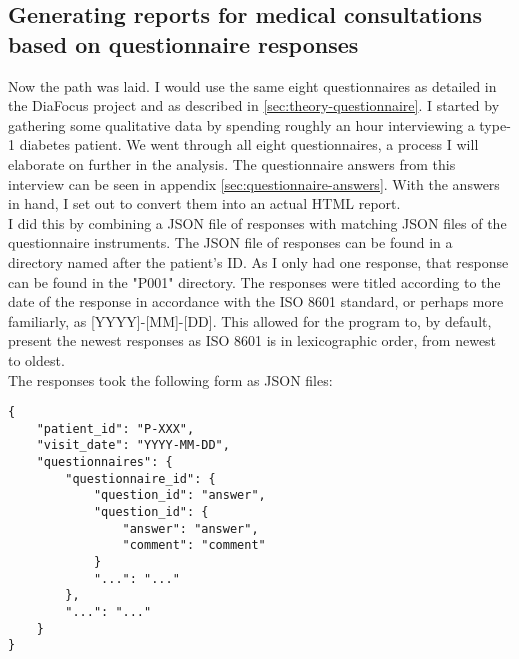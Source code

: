 \subsection{Generating reports for medical consultations based on questionnaire responses}
Now the path was laid. I would use the same eight questionnaires as detailed in the DiaFocus project and as described in \autoref{sec:theory-questionnaire}. I started by gathering some qualitative data by spending roughly an hour interviewing a type-1 diabetes patient. We went through all eight questionnaires, a process I will elaborate on further in the analysis. The questionnaire answers from this interview can be seen in appendix \autoref{sec:questionnaire-answers}. With the answers in hand, I set out to convert them into an actual HTML report.
\\
I did this by combining a JSON file of responses with matching JSON files of the questionnaire instruments. The JSON file of responses can be found in a directory named after the patient's ID. As I only had one response, that response can be found in the "P001" directory. The responses were titled according to the date of the response in accordance with the ISO 8601 standard, or perhaps more familiarly, as [YYYY]-[MM]-[DD]. This allowed for the program to, by default, present the newest responses as ISO 8601 is in lexicographic order, from newest to oldest.
\\
The responses took the following form as JSON files:

\begin{verbatim}
{
    "patient_id": "P-XXX",
    "visit_date": "YYYY-MM-DD",
    "questionnaires": {
        "questionnaire_id": {
            "question_id": "answer",
            "question_id": {
                "answer": "answer",
                "comment": "comment"
            }
            "...": "..."
        },
        "...": "..."
    }
}
\end{verbatim}

